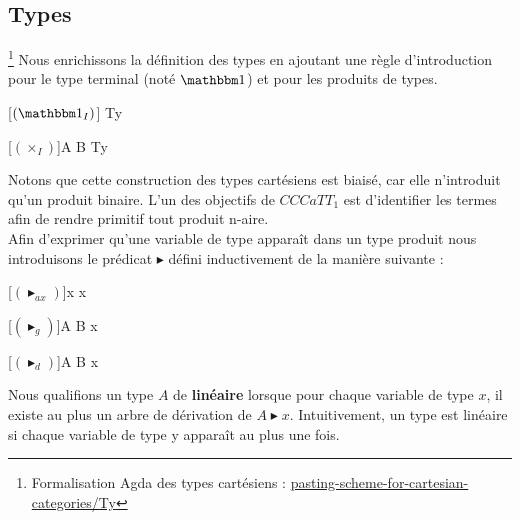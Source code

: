 \documentclass[conference]{IEEEtran}
\begin{document}
	\subsection{Types}
	\footnote{Formalisation Agda des types cartésiens : \href{https://github.com/ehouget/L3-ENS-Internship/tree/main/pasting-scheme-for-cartesian-categories/Ty}{pasting-scheme-for-cartesian-categories/Ty}}
	Nous enrichissons la définition des types en ajoutant une règle d'introduction pour le type terminal (noté $\mathbbm 1$) et pour les produits de types.
	\begin{center}
		\begin{prooftree}
			[$({\mathbbm 1}_I)$]{ \in Ty}
		\end{prooftree}
		\hspace{20pt}
		\begin{prooftree}
			\hypo[]{A \in Ty}
			\hypo[]{B \in Ty}
			[$(\times_I)$]{A \times B \in Ty}
		\end{prooftree}
	\end{center}
	Notons que cette construction des types cartésiens est biaisé, car elle n'introduit qu'un produit binaire. L'un des objectifs de $CCCaTT_1$ est d'identifier les termes afin de rendre primitif tout produit n-aire. \\
	
	Afin d'exprimer qu'une variable de type apparaît dans un type produit nous introduisons le prédicat $\blacktriangleright$ défini inductivement de la manière suivante :
	\vspace{10pt}
	\begin{center}
		\begin{prooftree}
			[$(\blacktriangleright_{ax})$]{x \blacktriangleright x}
		\end{prooftree}
		\hspace{30pt}
		\begin{prooftree}
			\hypo[]{A \blacktriangleright x}
			[$(\blacktriangleright_g)$]{A \times B \blacktriangleright x}
		\end{prooftree}
		\hspace{30pt}
		\begin{prooftree}
			\hypo[]{B \blacktriangleright x}
			[$(\blacktriangleright_d)$]{A \times B \blacktriangleright x}
		\end{prooftree}
	\end{center}
	\vspace{10pt}
	
	Nous qualifions un type $A$ de \textbf{linéaire} lorsque pour chaque variable de type $x$, il existe au plus un arbre de dérivation de $A \blacktriangleright x$. Intuitivement, un type est linéaire si chaque variable de type y apparaît au plus une fois. \\
	
\end{document}
